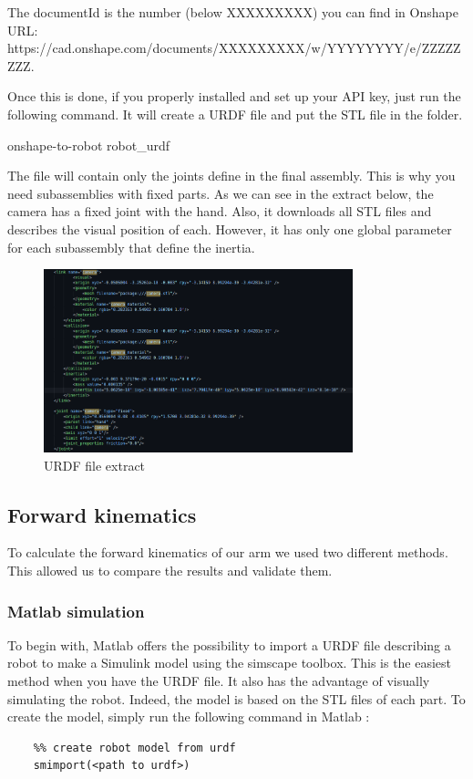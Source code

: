 The documentId is the number (below XXXXXXXXX) you can find in Onshape URL:
\\https://cad.onshape.com/documents/XXXXXXXXX/w/YYYYYYYY/e/ZZZZZZZZ.

\bigbreak
Once this is done, if you properly installed and set up your API key, just run the following command. It will create a URDF file and put the STL file in the folder.
\begin{commandshell}
    onshape-to-robot robot_urdf
\end{commandshell} 

\bigbreak
The file will contain only the joints define in the final assembly. This is why you need subassemblies with fixed parts. As we can see in the extract below, the camera has a fixed joint with the hand. Also, it downloads all STL files and describes the visual position of each. However, it has only one global parameter for each subassembly that define the inertia.

\begin{figure}[ht]
    \centering
    \includegraphics[width=0.8\textwidth]{Images/Section05/urdf.png}
    \caption{URDF file extract}
    \label{fig:URDFextract}
\end{figure}
\FloatBarrier

\subsection{Forward kinematics}

To calculate the forward kinematics of our arm we used two different methods. This allowed us to compare the results and validate them. 

\subsubsection{Matlab simulation}

To begin with, Matlab offers the possibility to import a URDF file describing a robot to make a Simulink model using the simscape toolbox. This is the easiest method when you have the URDF file. It also has the advantage of visually simulating the robot. Indeed, the model is based on the STL files of each part. To create the model, simply run the following command in Matlab : 
\begin{verbatim}
    %% create robot model from urdf
    smimport(<path to urdf>)
\end{verbatim}

